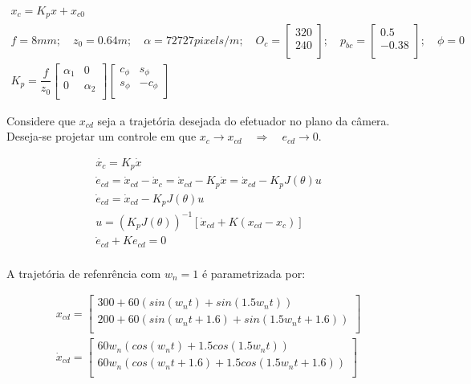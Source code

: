 \documentclass[a4paper,11pt]{article}
\theoremstyle{mytheor}
\begin{document}
\begin{gather*}
	x_c = K_p x + x_{c0} \\
	f = 8mm; \quad z_0=0.64m; \quad \alpha = 72727pixels/m; \quad O_c = 		\begin{bmatrix} 
		320 \\
		240 \\
	\end{bmatrix}; \quad p_{bc} = 
	\begin{bmatrix} 
		0.5 \\
		-0.38 \\
	\end{bmatrix}; \quad \phi = 0 \\
	K_p = \dfrac{f}{z_0}\begin{bmatrix} 
		\alpha_1 & 0 \\
		0 & \alpha_2 \\
	\end{bmatrix}\begin{bmatrix} 
		c_{\phi} & s_{\phi} \\
		s_{\phi} & -c_{\phi} \\
	\end{bmatrix}
\end{gather*}

Considere que $x_{cd}$ seja a trajetória desejada do efetuador no plano da câmera. Deseja-se projetar um controle em que $x_c \longrightarrow x_{cd} \quad \Rightarrow \quad e_{cd} \longrightarrow 0$.

\begin{gather*}
	\dot{x_c} = K_p \dot{x} \\
	\dot{e}_{cd} = \dot{x}_{cd} - \dot{x}_c = \dot{x}_{cd} - K_p \dot{x} = \dot{x}_{cd} - K_p J(\theta)u \\
	\dot{e}_{cd} = \dot{x}_{cd} - K_p J(\theta)u \\
	u = (K_p J(\theta))^{-1} [\dot{x}_{cd} + K(x_{cd} - x_c)] \\
	\dot{e}_{cd} + K e_{cd} = 0 \\
\end{gather*}

A trajetória de refenrência com $w_n = 1$ é parametrizada por:



\begin{gather*}
	x_{cd} = 
	\begin{bmatrix} 
		300 + 60 (sin(w_n t) + sin(1.5 w_n t)) \\
		200 + 60 (sin(w_n t + 1.6) + sin(1.5 w_n t + 1.6)) \\
	\end{bmatrix} \\
	\dot{x}_{cd} = 
	\begin{bmatrix} 
		60 w_n (cos(w_n t) + 1.5 cos(1.5 w_n t)) \\
		60 w_n (cos(w_n t + 1.6) + 1.5 cos(1.5 w_n t + 1.6)) \\
	\end{bmatrix}
\end{gather*}
\end{document}
